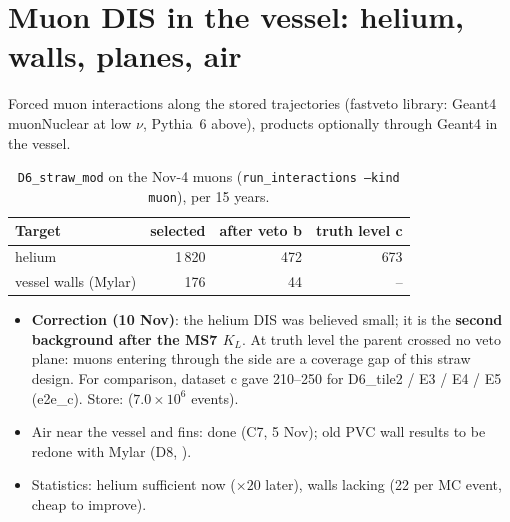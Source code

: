 \section{Muon DIS in the vessel: helium, walls, planes, air}

Forced muon interactions along the stored trajectories (fastveto library: Geant4 muonNuclear at low $\nu$,
Pythia~6 above), products optionally through Geant4 in the vessel.

\begin{table}[h]
\centering\small
\caption{\texttt{D6\_straw\_mod} on the Nov-4 muons (\texttt{run\_interactions --kind muon}), per 15 years.
}
\begin{tabular}{@{}lrrr@{}}
\toprule
Target & selected & after veto b & truth level c\\
\midrule
helium & 1\,820 & 472 & 673\\
vessel walls (Mylar) & 176 & 44 & --\\
\bottomrule
\end{tabular}
\end{table}

\begin{itemize}
\item \textbf{Correction (10 Nov)}: the helium DIS was believed small; it is the \textbf{second background after the
MS7 $K_L$}. At truth level the parent crossed no veto plane: muons entering through the side are a coverage gap of
this straw design. For comparison, dataset c gave 210--250 for D6\_tile2 / E3 / E4 / E5 (e2e\_c). Store:
 ($7.0\times10^6$ events). \est
\item Air near the vessel and fins: done (C7, 5 Nov); old PVC wall results to be redone with Mylar (D8, \open).
\item Statistics: helium sufficient now ($\times20$ later), walls lacking (22 per MC event, cheap to improve).
\end{itemize}
